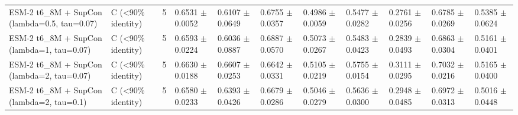 \begin{table}[ht]
\begin{tabular}{lllllllllll}
ESM-2 t6\_8M + SupCon (lambda=0.5, tau=0.07) & C (<90\% identity) & 5 & 0.6531 $\pm$ 0.0052 & 0.6107 $\pm$ 0.0649 & 0.6755 $\pm$ 0.0357 & 0.4986 $\pm$ 0.0059 & 0.5477 $\pm$ 0.0282 & 0.2761 $\pm$ 0.0256 & 0.6785 $\pm$ 0.0269 & 0.5385 $\pm$ 0.0624 \\
ESM-2 t6\_8M + SupCon (lambda=1, tau=0.07) & C (<90\% identity) & 5 & 0.6593 $\pm$ 0.0224 & 0.6036 $\pm$ 0.0887 & 0.6887 $\pm$ 0.0570 & 0.5073 $\pm$ 0.0267 & 0.5483 $\pm$ 0.0423 & 0.2839 $\pm$ 0.0493 & 0.6863 $\pm$ 0.0304 & 0.5161 $\pm$ 0.0401 \\
ESM-2 t6\_8M + SupCon (lambda=2, tau=0.07) & C (<90\% identity) & 5 & 0.6630 $\pm$ 0.0188 & 0.6607 $\pm$ 0.0253 & 0.6642 $\pm$ 0.0331 & 0.5105 $\pm$ 0.0219 & 0.5755 $\pm$ 0.0154 & 0.3111 $\pm$ 0.0295 & 0.7032 $\pm$ 0.0216 & 0.5165 $\pm$ 0.0400 \\
ESM-2 t6\_8M + SupCon (lambda=2, tau=0.1) & C (<90\% identity) & 5 & 0.6580 $\pm$ 0.0233 & 0.6393 $\pm$ 0.0426 & 0.6679 $\pm$ 0.0286 & 0.5046 $\pm$ 0.0279 & 0.5636 $\pm$ 0.0300 & 0.2948 $\pm$ 0.0485 & 0.6972 $\pm$ 0.0313 & 0.5016 $\pm$ 0.0448 \\
\hline
\end{tabular}
\end{table}
